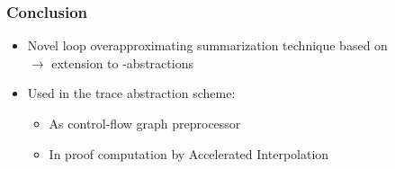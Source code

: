 \begin{frame}[t]
	\frametitle{Conclusion}
	\begin{center}
		\begin{itemize}
			\item Novel loop overapproximating summarization technique based on \qvasr \\
			\onslide<+->$\rightarrow$ extension to \qvasr-abstractions \vspace*{1cm}
			\onslide<+-> \item Used in the trace abstraction scheme:
				\begin{itemize}
				\onslide<+->	\item As control-flow graph preprocessor
				\onslide<+->	\item In proof computation by Accelerated Interpolation
				\end{itemize}
		\end{itemize}
	\end{center}
\end{frame}